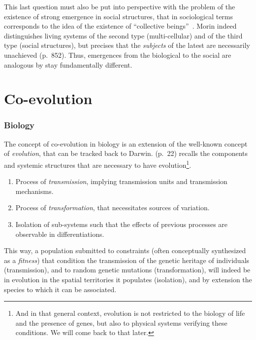 \documentclass[letterpaper]{article}
\begin{document}
This last question must also be put into perspective with the problem of the existence of strong emergence in social structures, that in sociological terms corresponds to the idea of the existence of ``collective beings''~\cite{angeletti2015etres}. Morin indeed distinguishes living systems of the second type (multi-cellular) and of the third type (social structures), but precises that the \emph{subjects} of the latest are necessarily unachieved\cite{morin1980methode} (p.~852). Thus, emergences from the biological to the social are analogous by stay fundamentally different.






\section{Co-evolution}

\subsubsection{Biology}

The concept of co-evolution in biology is an extension of the well-known concept of \emph{evolution}, that can be tracked back to Darwin. \cite{durham1991coevolution} (p.~22) recalls the components and systemic structures that are necessary to have evolution\footnote{And in that general context, evolution is not restricted to the biology of life and the presence of genes, but also to physical systems verifying these conditions. We will come back to that later.}.

\begin{enumerate}
\item Process of \emph{transmission}, implying transmission units and transmission mechanisms.
\item Process of \emph{transformation}, that necessitates sources of variation.
\item Isolation of sub-systems such that the effects of previous processes are observable in differentiations.
\end{enumerate}

This way, a population submitted to constraints (often conceptually synthesized as a \emph{fitness}) that condition the transmission of the genetic heritage of individuals (transmission), and to random genetic mutations (transformation), will indeed be in evolution in the spatial territories it populates (isolation), and by extension the species to which it can be associated. 
\end{document}
